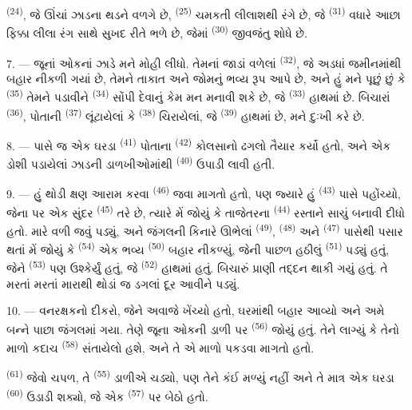  \textsuperscript{(24)}, જે ઊંચાં ઝાડના થડને વળગે છે,
 \textsuperscript{(25)} ચમકતી લીલાશથી રંગે છે, જે
 \textsuperscript{(31)} વધારે આછા ફિક્કા લીલા રંગ સાથે
સુખદ રીતે ભળે છે, જેમાં  \textsuperscript{(30)}
જીવજંતુ શોધે છે.

\VUsaut{3.0mm}
\VUsaut{3.0mm}

7. --- જૂનાં ઓકનાં ઝાડે મને મોહી લીધો. તેમનાં જાડાં વળેલાં
 \textsuperscript{(32)}, જે અડધાં જમીનમાંથી બહાર નીકળી
ગયાં છે, તેમને તાકાત અને જોમનું ભવ્ય રૂપ આપે છે, અને હું મને પૂછું છું
કે  \textsuperscript{(35)} તેમને પડાવીને
 \textsuperscript{(34)} સોંપી દેવાનું કેમ મન મનાવી શકે
છે, જે  \textsuperscript{(33)} હાથમાં છે.
બિચારાં  \textsuperscript{(36)}, પોતાની 
\textsuperscript{(37)} લૂંટાયેલાં કે 
\textsuperscript{(38)} ચિરાયેલાં, જે 
\textsuperscript{(39)} હાથમાં છે, મને દુઃખી કરે છે.

8. --- પાસે જ એક ઘરડા  \textsuperscript{(41)}
પોતાના  \textsuperscript{(42)} કોલસાનો ઢગલો તૈયાર કર્યો
હતો, અને એક ડોશી પડાયેલાં ઝાડની ડાળખીઓમાંથી 
 \textsuperscript{(40)} ઉપાડી લાવી હતી.

\VUsaut{3.0mm}
\VUsaut{3.0mm}

9. --- હું થોડી ક્ષણ આરામ કરવા 
\textsuperscript{(46)} જવા માગતો હતો, પણ જ્યારે હું 
\textsuperscript{(43)} પાસે પહોંચ્યો, જેના પર એક સુંદર 
\textsuperscript{(45)} તરે છે, ત્યારે મેં જોયું કે તાજેતરના
 \textsuperscript{(44)} રસ્તાને સાચું  બનાવી
દીધો હતો. મારે વળી જવું પડ્યું, અને જંગલની કિનારે ઊભેલાં
 \textsuperscript{(49)}, 
\textsuperscript{(48)} અને  \textsuperscript{(47)} પાસેથી
પસાર થતાં મેં જોયું કે  \textsuperscript{(54)} એક
ભવ્ય  \textsuperscript{(50)} બહાર નીકળ્યું, જેની પાછળ
હઠીલું  \textsuperscript{(51)} પડ્યું
હતું, જેને  \textsuperscript{(53)} પણ ઉશ્કેર્યું હતું,
જે  \textsuperscript{(52)} હાથમાં હતું.
બિચારું પ્રાણી તદ્દન થાકી ગયું હતું. તે મરતાં મરતાં મારાથી થોડાં જ
ડગલાં દૂર આવીને પડ્યું.

10. --- વનરક્ષકનો દીકરો, જેને  અવાજે ખેંચ્યો
હતો, ઘરમાંથી બહાર આવ્યો અને અમે બન્ને પાછા જંગલમાં ગયા. તેણે જૂના ઓકની
ડાળી પર  \textsuperscript{(56)} જોયું હતું. તેને લાગ્યું
કે તેનો માળો કદાચ  \textsuperscript{(58)} સંતાયેલો
હશે, અને તે એ માળો પકડવા માગતો હતો.

 \textsuperscript{(61)} જેવો ચપળ, તે 
\textsuperscript{(55)} ડાળીએ ચડ્યો, પણ તેને કંઈ મળ્યું નહીં અને તે
માત્ર એક ઘરડા  \textsuperscript{(60)} ઉડાડી શક્યો, જે
એક  \textsuperscript{(57)} પર બેઠો હતો.

\VUsaut{4.0mm}
\VUfilet{22mm}
